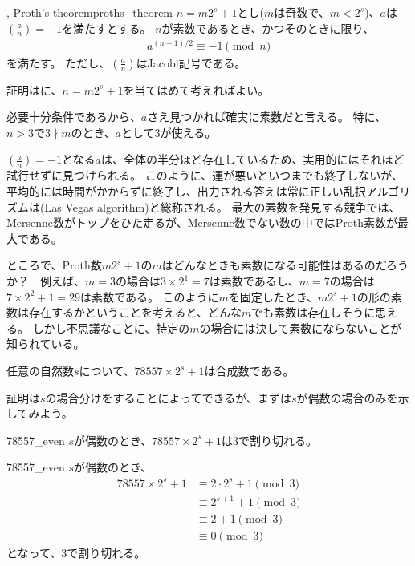 \begin{Theo}{, Proth's theorem}{proths_theorem}
$n=m2^s+1$とし($m$は奇数で、$m<2^s$)、$a$は$\left(\frac{a}{n}\right)=-1$を満たすとする。
$n$が素数であるとき、かつそのときに限り、
\begin{align*}
a^{(n-1)/2} \equiv -1 \pmod{n}
\end{align*}
を満たす。
ただし、$\left(\frac{a}{n}\right)$はJacobi記号である。
\end{Theo}

証明はに、$n=m2^s+1$を当てはめて考えればよい。


必要十分条件であるから、$a$さえ見つかれば確実に素数だと言える。
特に、$n>3$で$3 \nmid m$のとき、$a$として3が使える。


$\left(\frac{a}{n}\right)=-1$となる$a$は、全体の半分ほど存在しているため、実用的にはそれほど試行せずに見つけられる。
このように、運が悪いといつまでも終了しないが、平均的には時間がかからずに終了し、出力される答えは常に正しい乱択アルゴリズムは(Las Vegas algorithm)と総称される。
最大の素数を発見する競争では、Mersenne数がトップをひた走るが、Mersenne数でない数の中ではProth素数が最大である。

ところで、Proth数$m2^s+1$の$m$はどんなときも素数になる可能性はあるのだろうか？　例えば、$m=3$の場合は$3\times2^1=7$は素数であるし、$m=7$の場合は$7\times2^2+1=29$は素数である。
このように$m$を固定したとき、$m2^s+1$の形の素数は存在するかということを考えると、どんな$m$でも素数は存在しそうに思える。
しかし不思議なことに、特定の$m$の場合には決して素数にならないことが知られている。

\begin{Theo}{}{}
任意の自然数$s$について、$78557\times 2^s+1$は合成数である。
\end{Theo}

証明は$s$の場合分けをすることによってできるが、まずは$s$が偶数の場合のみを示してみよう。

\begin{Prop}{}{78557_even}
$s$が偶数のとき、$78557\times 2^s+1$は$3$で割り切れる。
\end{Prop}

\begin{prProof}{78557_even}
$s$が偶数のとき、
\begin{align*}
78557\times 2^s+1 &\equiv 2 \cdot 2^s + 1 \pmod{3}\\
&\equiv 2^{s+1} + 1 \pmod{3}\\
&\equiv 2 + 1 \pmod{3}\\
&\equiv 0 \pmod{3}
\end{align*}
となって、3で割り切れる。
\end{prProof}

